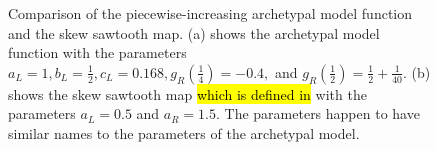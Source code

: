 \begin{figure}
	\centering
	\caption[Comparison of the piecewise-increasing archetypal model function and the skew sawtooth map]{
		Comparison of the piecewise-increasing archetypal model function and the skew sawtooth map.
		(a) shows the archetypal model function with the parameters $a_L = 1, b_L = \frac{1}{2}, c_L = 0.168, g_R\left(\frac{1}{4}\right) = -0.4 ,$ and $g_R\left(\frac{1}{2}\right) = \frac{1}{2} + \frac{1}{40}$.
		(b) shows the skew sawtooth map \hl{which is defined in} \cite{simpson2018saw} with the parameters $a_L = 0.5$ and $a_R = 1.5$.
		The parameters happen to have similar names to the parameters of the archetypal model.
	}
	\label{fig:add.saw.vs.arch}
\end{figure}
